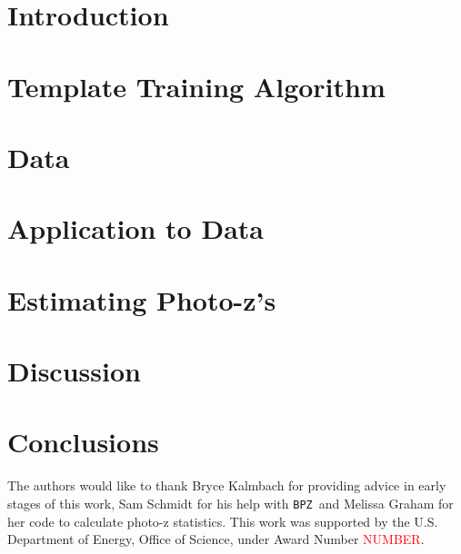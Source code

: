 \documentclass[twocolumn]{aastex63}
\newcommand{\note}[1]{\textsf{\textcolor{red}{#1}}}
\newcommand{\pzcode}[1]{\texttt{#1}}
\newcommand{\bpz}{\pzcode{BPZ}}
\begin{document}



\section{Introduction}
    
    
\section{Template Training Algorithm}
    
        
\section{Data}
    

\section{Application to Data}
      
    
\section{Estimating Photo-z's}
    

\section{Discussion}
    
    
\section{Conclusions}
    

\acknowledgments

The authors would like to thank Bryce Kalmbach for providing advice in early stages of this work, Sam Schmidt for his help with \bpz\, and Melissa Graham for her code to calculate photo-z statistics.
This work was supported by the U.S. Department of Energy, Office of Science, under Award Number \note{NUMBER}.
\end{document}
